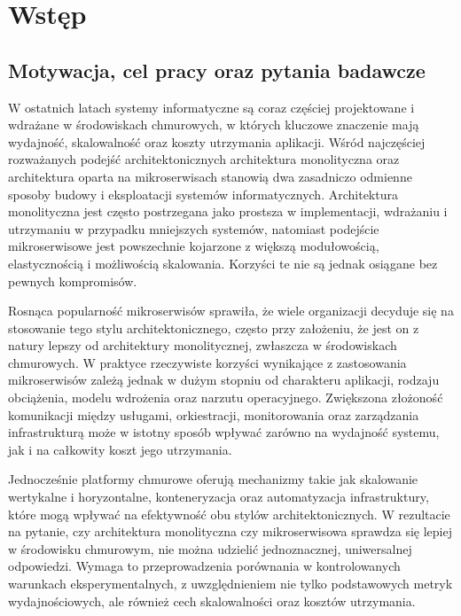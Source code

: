 \chapter{Wstęp}
\label{chapter:intro}
\section{Motywacja, cel pracy oraz pytania badawcze}

W ostatnich latach systemy informatyczne są coraz częściej projektowane i wdrażane w środowiskach chmurowych, w których kluczowe znaczenie mają wydajność, skalowalność oraz koszty utrzymania aplikacji\cite{kratzke2017cloudnative}. Wśród najczęściej rozważanych podejść architektonicznych architektura monolityczna oraz architektura oparta na mikroserwisach stanowią dwa zasadniczo odmienne sposoby budowy i eksploatacji systemów informatycznych\cite{bass2021software,newman2021building,dragoni2017microservices}. Architektura monolityczna jest często postrzegana jako prostsza w implementacji, wdrażaniu i utrzymaniu w przypadku mniejszych systemów, natomiast podejście mikroserwisowe jest powszechnie kojarzone z większą modułowością, elastycznością i możliwością skalowania\cite{auer2021assessment,gravanis2021monoliths,zimmermann2017microservices}. Korzyści te nie są jednak osiągane bez pewnych kompromisów\cite{soldani2018pains,waseem2026issues,felisberto2024tradeoffs}.

Rosnąca popularność mikroserwisów sprawiła, że wiele organizacji decyduje się na stosowanie tego stylu architektonicznego, często przy założeniu, że jest on z natury lepszy od architektury monolitycznej, zwłaszcza w środowiskach chmurowych\cite{francesco2019architecting,pahl2016microservices,jamshidi2018journey}. W praktyce rzeczywiste korzyści wynikające z zastosowania mikroserwisów zależą jednak w dużym stopniu od charakteru aplikacji, rodzaju obciążenia, modelu wdrożenia oraz narzutu operacyjnego\cite{avritzer2020scalability,hassan2022granularity,rodrigues2025assessment}. Zwiększona złożoność komunikacji między usługami, orkiestracji, monitorowania oraz zarządzania infrastrukturą może w istotny sposób wpływać zarówno na wydajność systemu, jak i na całkowity koszt jego utrzymania\cite{papakonstantinou2020technoeconomic,villamizar2017cost}.

Jednocześnie platformy chmurowe oferują mechanizmy takie jak skalowanie wertykalne i horyzontalne, konteneryzacja oraz automatyzacja infrastruktury, które mogą wpływać na efektywność obu stylów architektonicznych\cite{verticalhorizontalscaling}. W rezultacie na pytanie, czy architektura monolityczna czy mikroserwisowa sprawdza się lepiej w środowisku chmurowym, nie można udzielić jednoznacznej, uniwersalnej odpowiedzi\cite{electronics13081452,milic2022quality,felisberto2024tradeoffs}. Wymaga to przeprowadzenia porównania w kontrolowanych warunkach eksperymentalnych, z uwzględnieniem nie tylko podstawowych metryk wydajnościowych, ale również cech skalowalności oraz kosztów utrzymania\cite{mangwani2023evaluation}.

